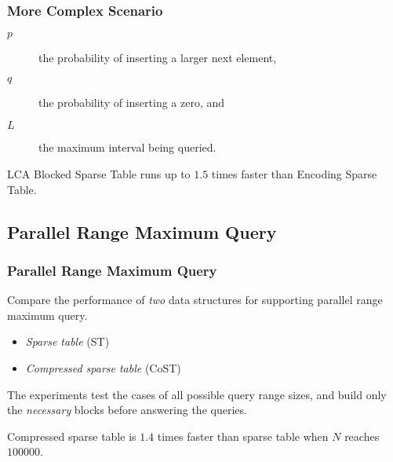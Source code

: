 \begin{frame}
	\frametitle{More Complex Scenario}
	\begin{description}
		\item[$p$]
			the probability of inserting a larger next element,
		\item[$q$]
			the probability of inserting a zero, and
		\item[$L$]
			the maximum interval being queried.
	\end{description}
	\begin{center}
	\scalebox{0.65} { \begin{minipage}{1.53\textwidth}
			
			\end{minipage}
		}
	\end{center}
	{\sc LCA Blocked Sparse Table} runs up to $1.5$ times faster than
	{\sc Encoding Sparse Table}.
\end{frame}

\subsection{Parallel Range Maximum Query}
\begin{frame}
    \frametitle{Parallel Range Maximum Query}
    Compare the performance of {\em two} data structures for supporting
	parallel range maximum query.

	\begin{itemize}
		\item 
			{\em Sparse table} ({\sc ST})
		\item 
			{\em Compressed sparse table} ({\sc CoST})
	\end{itemize}
	\vspace{1em}
	The experiments test the cases of all possible query range sizes,
	and build only the {\em necessary} blocks before answering the
	queries.
\end{frame}

\begin{frame}
	Compressed sparse table is $1.4$ times faster than sparse table when
	$N$ reaches $100000$.
	\begin{center}
	\scalebox{0.65} { \begin{minipage}{1.53\textwidth}
			
			\end{minipage}
		}
	\end{center}
\end{frame}
